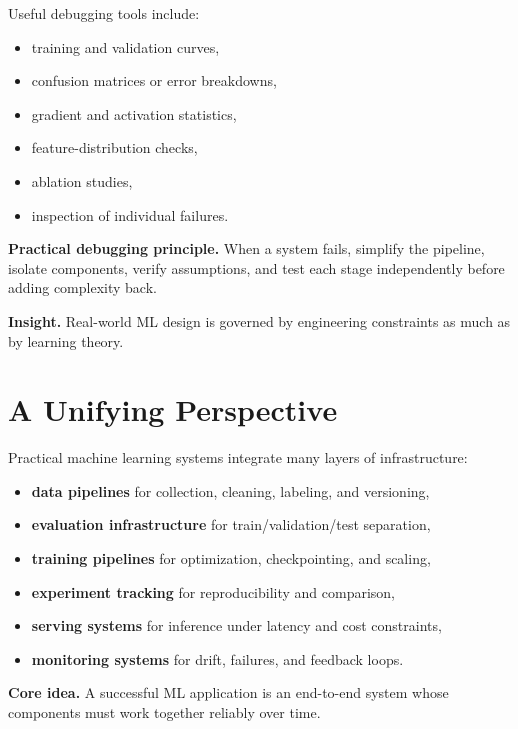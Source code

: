 \medskip

\noindent
Useful debugging tools include:
\begin{itemize}
    \item training and validation curves,
    \item confusion matrices or error breakdowns,
    \item gradient and activation statistics,
    \item feature-distribution checks,
    \item ablation studies,
    \item inspection of individual failures.
\end{itemize}

\medskip

\noindent
\textbf{Practical debugging principle.}
When a system fails, simplify the pipeline, isolate components, verify assumptions, and test each stage independently before adding complexity back.

\medskip

\noindent
\textbf{Insight.}
Real-world ML design is governed by engineering constraints as much as by learning theory.

\section{A Unifying Perspective}

Practical machine learning systems integrate many layers of infrastructure:
\begin{itemize}
    \item \textbf{data pipelines} for collection, cleaning, labeling, and versioning,
    \item \textbf{evaluation infrastructure} for train/validation/test separation,
    \item \textbf{training pipelines} for optimization, checkpointing, and scaling,
    \item \textbf{experiment tracking} for reproducibility and comparison,
    \item \textbf{serving systems} for inference under latency and cost constraints,
    \item \textbf{monitoring systems} for drift, failures, and feedback loops.
\end{itemize}

\medskip

\noindent
\textbf{Core idea.}
A successful ML application is an end-to-end system whose components must work together reliably over time.

